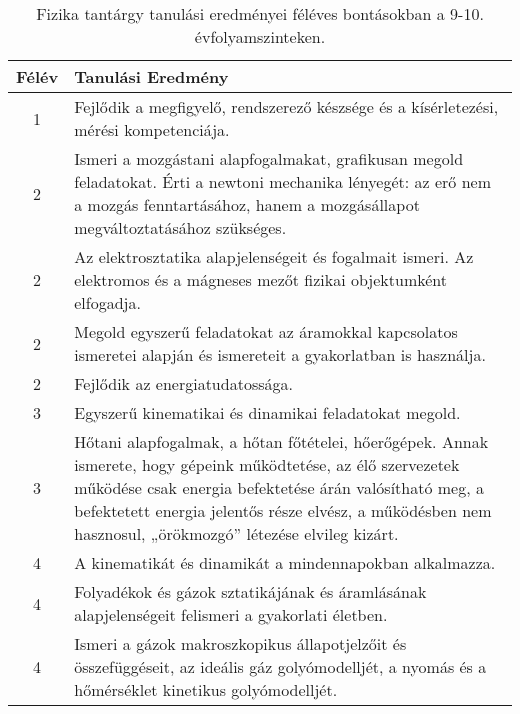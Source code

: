            \begin{longtable}{c | p{12cm} }
            \caption[Fizika 9-10.]{Fizika tantárgy tanulási eredményei féléves bontásokban a 9-10. évfolyamszinteken. }  \\

            \textbf{Félév} & \textbf{Tanulási Eredmény} \\
            \hline
            \endhead
                                
                                          1 &  Fejlődik a megfigyelő, rendszerező készsége és a kísérletezési, mérési kompetenciája. \\ \hline
                                      
                                
                                          2 &  Ismeri a mozgástani alapfogalmakat, grafikusan megold feladatokat. Érti a newtoni mechanika lényegét: az erő nem a mozgás fenntartásához, hanem a mozgásállapot megváltoztatásához szükséges. \\ \hline
                                          2 &  Az elektrosztatika alapjelenségeit és fogalmait ismeri. Az elektromos és a mágneses mezőt fizikai objektumként elfogadja. \\ \hline
                                          2 &  Megold egyszerű feladatokat az áramokkal kapcsolatos ismeretei alapján és ismereteit a gyakorlatban is használja. \\ \hline
                                          2 &  Fejlődik az energiatudatossága. \\ \hline
                                      
                                
                                          3 &  Egyszerű kinematikai és dinamikai feladatokat megold. \\ \hline
                                          3 &  Hőtani alapfogalmak, a hőtan főtételei, hőerőgépek. Annak ismerete, hogy gépeink működtetése, az élő szervezetek működése csak energia befektetése árán valósítható meg, a befektetett energia jelentős része elvész, a működésben nem hasznosul, „örökmozgó” létezése elvileg kizárt. \\ \hline
                                      
                                
                                          4 &  A kinematikát és dinamikát a mindennapokban alkalmazza. \\ \hline
                                          4 &  Folyadékok és gázok sztatikájának és áramlásának alapjelenségeit felismeri a gyakorlati életben. \\ \hline
                                          4 &  Ismeri a gázok makroszkopikus állapotjelzőit és összefüggéseit, az ideális gáz golyómodelljét, a nyomás és a hőmérséklet kinetikus golyómodelljét. \\ \hline
                                      
                        \end{longtable}
            \clearpage

